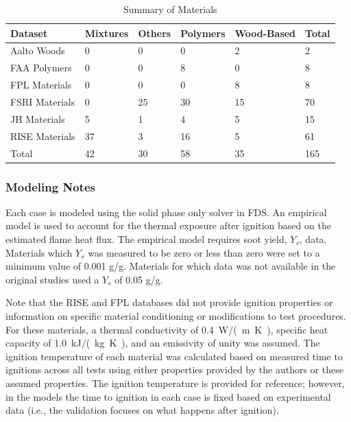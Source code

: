 \begin{table}[!h]
\caption[Summary of Materials]{Summary of Materials}
\centering
\begin{tabular}{|l|p{1.6cm}|p{1.6cm}|p{1.6cm}|p{1.6cm}|p{1.6cm}|}
\hline
Dataset             & Mixtures    & Others      & Polymers    & Wood-Based  & Total       \\ \hline
Aalto Woods         & 0           & 0           & 0           & 2           & 2           \\ \hline
FAA Polymers        & 0           & 0           & 8           & 0           & 8           \\ \hline
FPL Materials       & 0           & 0           & 0           & 8           & 8           \\ \hline
FSRI Materials      & 0           & 25          & 30          & 15          & 70         \\ \hline
JH Materials        & 5           & 1           & 4           & 5           & 15          \\ \hline
RISE Materials      & 37          & 3           & 16          & 5           & 61          \\ \hline
Total               & 42          & 30          & 58          & 35          & 165         \\ \hline
\end{tabular}
\label{Scaling_Pyrolysis_Materials}
\end{table}


\subsubsection{Modeling Notes}

Each case is modeled using the solid phase only solver in FDS.
An empirical model is used to account for the thermal exposure after ignition based on the estimated flame heat flux.
The empirical model requires soot yield, $Y_{s}$, data.
Materials which $Y_{s}$ was measured to be zero or less than zero were set to a minimum value of 0.001 g/g.
Materials for which data was not available in the original studies used a $Y_{s}$ of 0.05 g/g.

Note that the RISE and FPL databases did not provide ignition properties or information on specific material conditioning or modifications to test procedures. For these materials, a thermal conductivity of 0.4~\unit{W/(m.K)}, specific heat capacity of 1.0~\unit{kJ/(kg.K)}, and an emissivity of unity was assumed. The ignition temperature of each material was calculated based on measured time to ignitions across all tests using either properties provided by the authors or these assumed properties. The ignition temperature is provided for reference; however, in the models the time to ignition in each case is fixed based on experimental data (i.e., the validation focuses on what happens after ignition).

